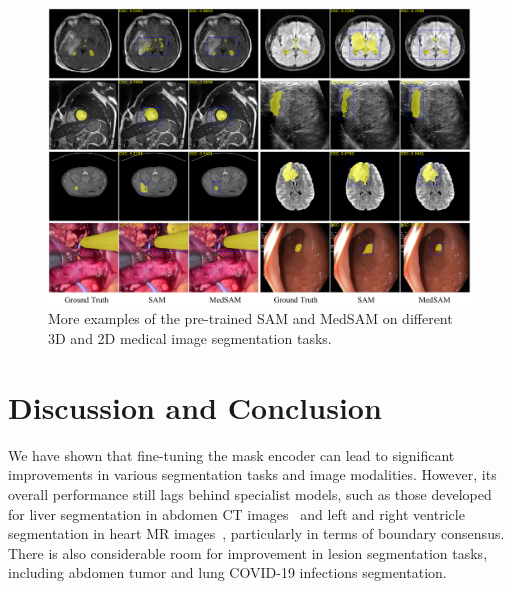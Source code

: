\documentclass[runningheads]{llncs}
\begin{document}
\begin{figure}[htbp]
\centering
\includegraphics[scale=0.41]{imgs/fig5-MedSAM-Res2.png}
\caption{More examples of the pre-trained SAM and MedSAM on different 3D and 2D medical image segmentation tasks.}
\label{fig:medsam2}
\end{figure}

% 




\section{Discussion and Conclusion}
We have shown that fine-tuning the mask encoder can lead to significant improvements in various segmentation tasks and image modalities. However, its overall performance still lags behind specialist models, such as those developed for liver segmentation in abdomen CT images~\cite{FLARE21-MIA} and left and right ventricle segmentation in heart MR images~\cite{MMs2020}, particularly in terms of boundary consensus. There is also considerable room for improvement in lesion segmentation tasks, including abdomen tumor and lung COVID-19 infections segmentation.
\end{document}
